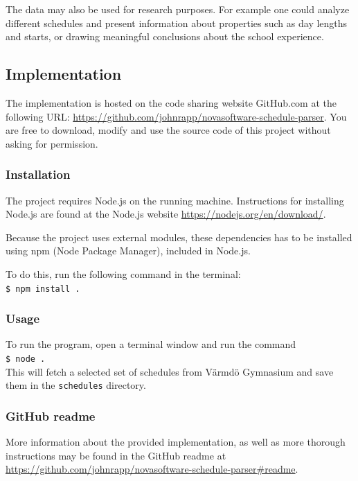 \documentclass{article}
\begin{document}
	The data may also be used for research purposes. For example one could analyze different schedules and present information about properties such as day lengths and starts, or drawing meaningful conclusions about the school experience.
	
	\subsection{Implementation}
	The implementation is hosted on the code sharing website GitHub.com at the following URL: \url{https://github.com/johnrapp/novasoftware-schedule-parser}. You are free to download, modify and use the source code of this project without asking for permission.
	
	\subsubsection{Installation}
	The project requires Node.js on the running machine. Instructions for installing Node.js are found at the Node.js website \url{https://nodejs.org/en/download/}.
	
	Because the project uses external modules, these dependencies has to be installed using npm (Node Package Manager), included in Node.js.
	
	To do this, run the following command in the terminal:\\
	\texttt{\$ npm install .}
	
	\subsubsection{Usage}
	To run the program, open a terminal window and run the command\\
	\texttt{\$ node .}\\
	This will fetch a selected set of schedules from Värmdö Gymnasium and save them in the \texttt{schedules} directory.
	
	\subsubsection{GitHub readme}
	More information about the provided implementation, as well as more thorough instructions may be found in the GitHub readme at \url{https://github.com/johnrapp/novasoftware-schedule-parser#readme}.
	
\end{document}
